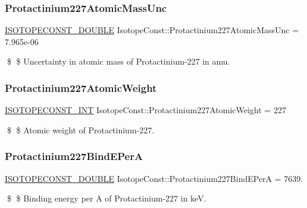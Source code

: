 \subsubsection{\texorpdfstring{Protactinium227\+Atomic\+Mass\+Unc}{Protactinium227AtomicMassUnc}}
{\footnotesize\ttfamily \mbox{\hyperlink{group___isotope_const-_macros_ga8f45a7272ce02c0b4c65c44636ed719a}{I\+S\+O\+T\+O\+P\+E\+C\+O\+N\+S\+T\+\_\+\+D\+O\+U\+B\+LE}} Isotope\+Const\+::\+Protactinium227\+Atomic\+Mass\+Unc = 7.\+965e-\/06}

\$ \$ Uncertainty in atomic mass of Protactinium-\/227 in amu. \mbox{\label{group___isotope_const-_protactinium-_pa227_gac234f61b3b03eb7d107e69adf47ba297}} 
\subsubsection{\texorpdfstring{Protactinium227\+Atomic\+Weight}{Protactinium227AtomicWeight}}
{\footnotesize\ttfamily \mbox{\hyperlink{group___isotope_const-_macros_ga5f18360b3e99483a35c32d789e62621c}{I\+S\+O\+T\+O\+P\+E\+C\+O\+N\+S\+T\+\_\+\+I\+NT}} Isotope\+Const\+::\+Protactinium227\+Atomic\+Weight = 227}

\$ \$ Atomic weight of Protactinium-\/227. \mbox{\label{group___isotope_const-_protactinium-_pa227_gad83127fe5df7fd2f71e4e5a8469790fd}} 
\subsubsection{\texorpdfstring{Protactinium227\+Bind\+E\+PerA}{Protactinium227BindEPerA}}
{\footnotesize\ttfamily \mbox{\hyperlink{group___isotope_const-_macros_ga8f45a7272ce02c0b4c65c44636ed719a}{I\+S\+O\+T\+O\+P\+E\+C\+O\+N\+S\+T\+\_\+\+D\+O\+U\+B\+LE}} Isotope\+Const\+::\+Protactinium227\+Bind\+E\+PerA = 7639.}

\$ \$ Binding energy per A of Protactinium-\/227 in keV. \mbox{\label{group___isotope_const-_protactinium-_pa227_gab973403853f3d25b139a6a21af10fd6b}} 
